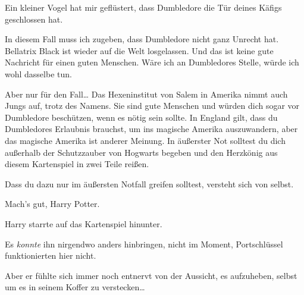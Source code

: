 \begin{writtenNote}
Ein kleiner Vogel hat mir geflüstert, dass Dumbledore die Tür deines Käfigs geschlossen hat.

In diesem Fall muss ich zugeben, dass Dumbledore nicht ganz Unrecht hat. Bellatrix Black ist wieder auf die Welt losgelassen. Und das ist keine gute Nachricht für einen guten Menschen. Wäre ich an Dumbledores Stelle, würde ich wohl dasselbe tun.

Aber nur für den Fall… Das Hexeninstitut von Salem in Amerika nimmt auch Jungs auf, trotz des Namens. Sie sind gute Menschen und würden dich sogar vor Dumbledore beschützen, wenn es nötig sein sollte. In England gilt, dass du Dumbledores Erlaubnis brauchst, um ins magische Amerika auszuwandern, aber das magische Amerika ist anderer Meinung. In äußerster Not solltest du dich außerhalb der Schutzzauber von Hogwarts begeben und den Herzkönig aus diesem Kartenspiel in zwei Teile reißen.

Dass du dazu nur im äußersten Notfall greifen solltest, versteht sich von selbst.

Mach’s gut, Harry Potter.

\end{writtenNote}

Harry starrte auf das Kartenspiel hinunter.

Es \emph{konnte} ihn nirgendwo anders hinbringen, nicht im Moment, Portschlüssel funktionierten hier nicht.

Aber er fühlte sich immer noch entnervt von der Aussicht, es aufzuheben, selbst um es in seinem Koffer zu verstecken…


